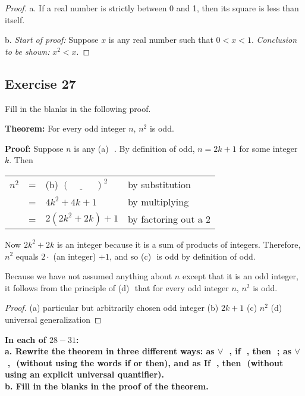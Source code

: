 \documentclass[14pt]{extarticle}
\newcommand{\fbl}{\underline{\hspace{1cm}}\,\,}
\newcommand{\fa}{\forall}
\newcommand{\cy}{\color{cyan}}
\begin{document}
\begin{proof}
    a. If a real number is strictly between 0 and 1, then its square is less than itself.

    b. {\it Start of proof:} Suppose $x$ is any real number such that $0 < x < 1$. {\it Conclusion to be shown:} $x^2 < x$.
\end{proof}

\subsection{Exercise 27}
Fill in the blanks in the following proof.

    {\bf Theorem:} For every odd integer $n$, $n^2$ is odd.

    {\bf Proof:} Suppose $n$ is any {\cy (a)} \fbl. By definition of odd, $n = 2k + 1$ for some integer $k$. Then

\begin{center}
    \begin{tabular}{rcll}
        $n^2$ & = & {\cy (b)} $(\fbl)^2$ & \cy by substitution      \\
              & = & $4k^2 + 4k + 1$      & \cy by multiplying       \\
              & = & $2(2k^2 + 2k) + 1$   & \cy by factoring out a 2 \\
    \end{tabular}
\end{center}

Now $2k^2 + 2k$ is an integer because it is a sum of products of integers. Therefore, $n^2$ equals $2\cdot$ (an integer) $+ 1$, and so {\cy (c)} \fbl is odd by definition of odd.

Because we have not assumed anything about $n$ except that it is an odd integer, it follows from the principle of {\cy (d)} \fbl that for every odd integer $n$, $n^2$ is odd.

\begin{proof}
    (a) particular but arbitrarily chosen odd integer
    (b) $2k + 1$ (c) $n^2$ (d) universal generalization
\end{proof}

{\bf \cy In each of $28-31$: \\
a. Rewrite the theorem in three different ways: as $\fa$ \fbl, if \fbl, then \fbl; as $\fa$ \fbl, \fbl (without using the words if or then), and as If \fbl, then \fbl (without using an explicit universal quantifier). \\
b. Fill in the blanks in the proof of the theorem.}
\end{document}
